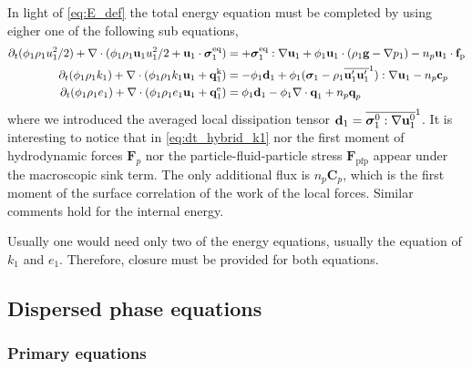 In light of \ref{eq:E_def} the total energy equation must be completed by using eigher one of the following sub equations, 
\begin{align}
    \partial_t (\phi_1 \rho_1u_1^2/2)  
    + \mathbf{\nabla}\cdot (
        \phi_1 \rho_1\textbf{u}_1u_1^2/2
        + \textbf{u}_1 \cdot \bm{\sigma}_1^\text{eq}
    )
    &= 
    + \bm{\sigma}_1^\text{eq} : \mathbf{\nabla} \textbf{u}_1
    + \phi_1  \textbf{u}_1\cdot(\rho_1 \textbf{g} - \mathbf{\nabla} p_1) 
    - n_p \textbf{u}_1\cdot \textbf{f}_\text{p}\\
    \label{eq:dt_hybrid_k1}
    \partial_t (\phi_1\rho_1k_1)  
    + \mathbf{\nabla}\cdot (
        \phi_1\rho_1k_1\textbf{u}_1
        + \textbf{q}_1^\text{k} 
        )
    &= 
    - \phi_1\textbf{d}_1
    + \phi_1(\bm{\sigma}_1 - \rho_1 \overline{\textbf{u}_1'\textbf{u}_1'}^1 ): \mathbf{\nabla} \textbf{u}_1
    - n_p \textbf{c}_p\\
    \partial_t (\phi_1\rho_1e_1)  
    + \mathbf{\nabla}\cdot (
        \phi_1 \rho_1e_1\textbf{u}_1
        +
        \textbf{q}_1^\text{e} 
        )
    &= 
    \phi_1\textbf{d}_1
    - \phi_1 \mathbf{\nabla}\cdot \textbf{q}_1
    + n_p \textbf{q}_p
\end{align}
where we introduced the averaged local dissipation tensor $\textbf{d}_1 = \overline{\bm{\sigma}_1^0 : \mathbf{\nabla} \textbf{u}_1^0}^1$. 
It is interesting to notice that in \ref{eq:dt_hybrid_k1} nor the first moment of hydrodynamic forces $\textbf{F}_p$ nor the particle-fluid-particle stress $\textbf{F}_\text{pfp}$ appear under the macroscopic sink term. 
The only additional flux is $n_p \textbf{C}_p$, which is the first moment of the surface correlation of the work of the local forces. 
Similar comments hold for the  internal energy. 

Usually one would need only two of the energy equations, usually the equation of $k_1$ and $e_1$.
Therefore, closure must be provided for both equations. 


\subsection{Dispersed phase equations}

\subsubsection{Primary equations}

